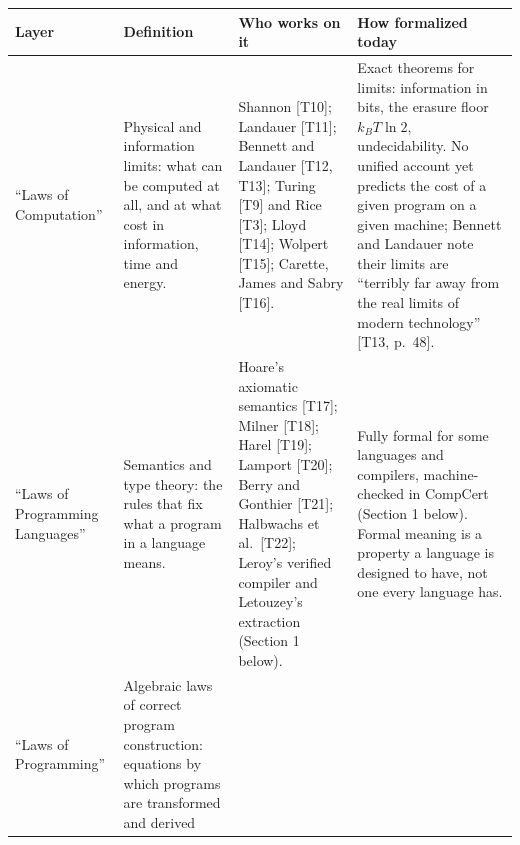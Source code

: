 \documentclass[10pt,letterpaper]{article}
\begin{document}
{\footnotesize\setlength{\tabcolsep}{3.8pt}\renewcommand{\arraystretch}{1.15}
\begin{longtable}[]{@{}
  >{\raggedright\arraybackslash}p{}
  >{\raggedright\arraybackslash}p{}
  >{\raggedright\arraybackslash}p{}
  >{\raggedright\arraybackslash}p{}@{}}
\toprule\noalign{}
\begin{minipage}[b]{\linewidth}\raggedright
\textbf{Layer}
\end{minipage} & \begin{minipage}[b]{\linewidth}\raggedright
\textbf{Definition}
\end{minipage} & \begin{minipage}[b]{\linewidth}\raggedright
\textbf{Who works on it}
\end{minipage} & \begin{minipage}[b]{\linewidth}\raggedright
\textbf{How formalized today}
\end{minipage} \\
\midrule\noalign{}
\endhead
\bottomrule\noalign{}
\endlastfoot
``Laws of Computation'' & Physical and information limits: what can be
computed at all, and at what cost in information, time and energy. &
Shannon {[}T10{]}; Landauer {[}T11{]}; Bennett and Landauer {[}T12,
T13{]}; Turing {[}T9{]} and Rice {[}T3{]}; Lloyd {[}T14{]}; Wolpert
{[}T15{]}; Carette, James and Sabry {[}T16{]}. & Exact theorems for
limits: information in bits, the erasure floor \(k_BT\ln 2\),
undecidability. No unified account yet predicts the cost of a given
program on a given machine; Bennett and Landauer note their limits are
``terribly far away from the real limits of modern technology'' {[}T13,
p.~48{]}. \\
``Laws of Programming Languages'' & Semantics and type theory: the rules
that fix what a program in a language means. & Hoare's axiomatic
semantics {[}T17{]}; Milner {[}T18{]}; Harel {[}T19{]}; Lamport
{[}T20{]}; Berry and Gonthier {[}T21{]}; Halbwachs et al.~{[}T22{]};
Leroy's verified compiler and Letouzey's extraction (Section 1 below). &
Fully formal for some languages and compilers, machine-checked in
CompCert (Section 1 below). Formal meaning is a property a language is
designed to have, not one every language has. \\
``Laws of Programming'' & Algebraic laws of correct program
construction: equations by which programs are transformed and derived

\end{longtable}}
\end{document}
